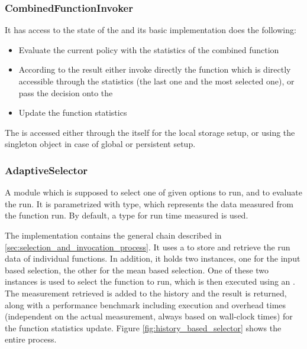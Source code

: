 \subsubsection{CombinedFunctionInvoker}

It has access to the state of the  and its basic implementation does the following:

\begin{itemize}
	\item Evaluate the current policy with the statistics of the combined function
	\item According to the result either invoke directly the function which is directly accessible through the statistics (the last one and the most selected one), or pass the decision onto the 
	\item Update the function statistics
\end{itemize}

The  is accessed either through the  itself for the local storage setup, or using the singleton object  in case of global or persistent setup.

\subsubsection{AdaptiveSelector}

A module which is supposed to select one of given options to run, and to evaluate the run. It is parametrized with  type, which represents the data measured from the function run. By default, a  type for run time measured is used.

The implementation  contains the general chain described in \ref{sec:selection_and_invocation_process}. It uses a  to store and retrieve the run data of individual functions. In addition, it holds two  instances, one for the input based selection, the other for the mean based selection. One of these two instances is used to select the function to run, which is then executed using an . The measurement retrieved is added to the history and the result is returned, along with a performance benchmark including execution and overhead times (independent on the actual measurement, always based on wall-clock times) for the function statistics update. Figure \ref{fig:history_based_selector} shows the entire process.

